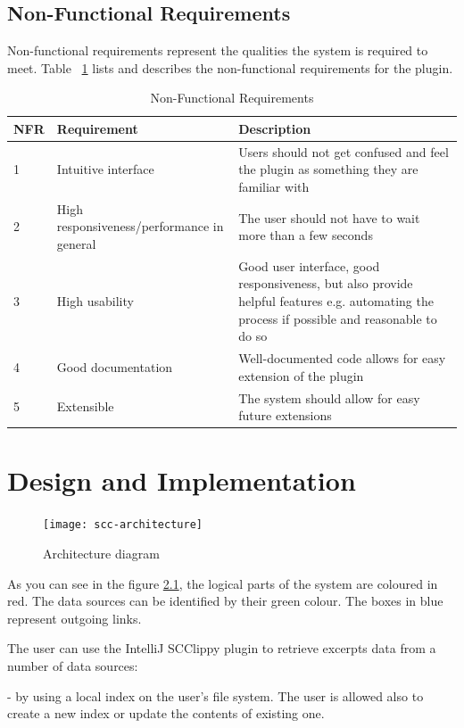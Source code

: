 \documentclass{l4proj}
\begin{document}
\section{Non-Functional Requirements}
Non-functional requirements represent the qualities the system is required to meet. Table ~\ref{table:nonFuncTable}  lists and describes the non-functional requirements for the plugin.
\begin{table}[h]
\caption{Non-Functional Requirements}
\centering
\def\arraystretch{1.5}
\begin{tabular}{p{2cm}p{4cm}p{9cm}}
\hline
NFR & Requirement & Description \\
\hline
1 & Intuitive interface & Users should not get confused and feel the plugin as something they are familiar with \\
2 & High responsiveness/performance in general & The user should not have to wait more than a few seconds \\
3 & High usability & Good user interface, good responsiveness, but also provide helpful features e.g. automating the process if possible and reasonable to do so \\
4 & Good documentation & Well-documented code allows for easy extension of the plugin \\
5 & Extensible & The system should allow for easy future extensions\\
\hline
\end{tabular}
\label{table:nonFuncTable}
\end{table}

\chapter{Design and Implementation}

\begin{figure}[h]
\caption{Architecture diagram}
\texttt{[image: scc-architecture]}
\centering
\label{fig:architecture}
\end{figure}
As you can see in the figure \ref{fig:architecture}, the logical parts of the system are coloured in red. The data sources can be identified by their green colour. The boxes in blue represent outgoing links.

The user can use the IntelliJ SCClippy plugin to retrieve excerpts data from a number of data sources:

- by using a local index on the user's file system. The user is allowed also to create a new index or update the contents of existing one. 
\end{document}

